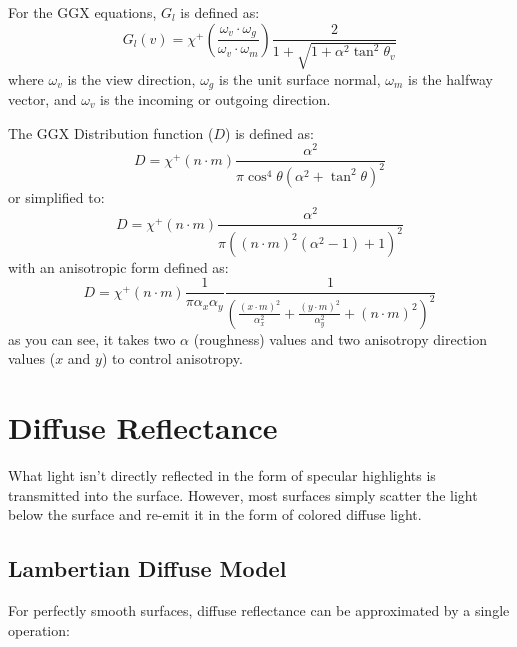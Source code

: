 \documentclass[12pt,letterpaper]{article}
\begin{document}
For the GGX equations, $G_l$ is defined as:
$$
G_l(v) = \chi^+ \left(\frac{\omega_v \cdot \omega_g}{\omega_v \cdot \omega_m} \right)
\frac{2}{1 + \sqrt{1 + \alpha^2 \tan^2 \theta_v}}
$$
where $\omega_v$ is the view direction, $\omega_g$ is the unit surface normal, $\omega_m$ is the halfway vector, and $\omega_v$ is the incoming or outgoing direction.

The GGX Distribution function ($D$) is defined as:
$$
D = \chi^+\left(n \cdot m\right) \frac{\alpha^2}{\pi \cos^4 \theta {\left(  \alpha^2 + \tan^2 \theta \right)}^2}
$$
or simplified to:
$$
D = \chi^+\left(n \cdot m\right) \frac{\alpha^2}{\pi {\left( {\left( n \cdot m \right)}^2 \left(\alpha^2 - 1\right) + 1 \right)}^2}
$$
with an anisotropic form defined as:
$$
D = \chi^+\left(n \cdot m\right) \frac{1}{\pi \alpha_x \alpha_y} \frac{1}{{\left(
    \frac{{\left( x \cdot m \right)}^2}{\alpha^{2}_{x}} +
    \frac{{\left( y \cdot m \right)}^2}{\alpha^{2}_{y}} +
    {\left( n \cdot m \right)}^2
\right)}^2}
$$
as you can see, it takes two $\alpha$ (roughness) values and two anisotropy direction values ($x$ and $y$) to control anisotropy.

\newpage

\section{Diffuse Reflectance}

What light isn't directly reflected in the form of specular highlights is transmitted into the surface. However, most surfaces simply scatter the light 
below the surface and re-emit it in the form of colored diffuse light.

\subsection{Lambertian Diffuse Model}

For perfectly smooth surfaces, diffuse reflectance can be approximated by a single operation:
\end{document}
